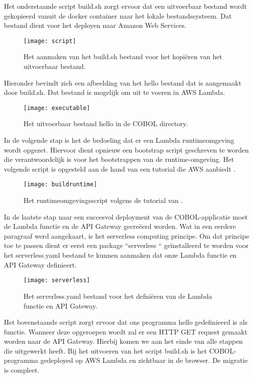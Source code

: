 \newpage
Het onderstaande script build.sh zorgt ervoor dat een uitvoerbaar bestand wordt gekopieerd vanuit de docker container naar het lokale bestandssysteem. Dat bestand dient voor het deployen naar Amazon Web Services. 

  \begin{figure}[h]
    \centering
    \texttt{[image: script]}
    \caption{Het aanmaken van het build.sh bestand voor het kopiëren van het uitvoerbaar bestand.}
\end{figure}

Hieronder bevindt zich een afbeelding van het hello bestand dat is aangemaakt door build.sh. Dat bestand is mogelijk om uit te voeren in AWS Lambda.

  \begin{figure}[h]
    \centering
    \texttt{[image: executable]}
    \caption{Het uitvoerbaar bestand hello in de COBOL directory.}
\end{figure}

\newpage
In de volgende stap is het de bedoeling dat er een Lambda runtimeomgeving wordt opgezet. Hiervoor dient opnieuw een bootstrap script geschreven te worden die verantwoordelijk is voor het bootstrappen van de runtime-omgeving. Het volgende script is opgesteld aan de hand van een tutorial die AWS aanbiedt \autocite{AWS2022}. 

 \begin{figure}[h]
    \centering
    \texttt{[image: buildruntime]}
    \caption{Het runtimeomgevingsscript volgens de tutorial van \autocite{AWS2022}.}
\end{figure}

In de laatste stap naar een succesvol deployment van de COBOL-applicatie moet de Lambda functie en de API Gateway gecreëerd worden. Wat in een eerdere paragraaf werd aangekaart, is het serverless computing principe. Om dat principe toe te passen dient er eerst een package ``serverless `` geïnstalleerd te worden voor het serverless.yaml bestand te kunnen aanmaken dat onze Lambda functie en API Gateway definieert. 

 \begin{figure}[h]
    \centering
    \texttt{[image: serverless]}
    \caption{Het serverless.yaml bestand voor het defniëren van de Lambda functie en API Gateway.}
\end{figure}

\newpage

Het bovenstaande script zorgt ervoor dat ons programma hello gedefinieerd is als functie. Wanneer deze opgeroepen wordt zal er een HTTP GET request gemaakt worden naar de API Gateway. Hierbij komen we aan het einde van alle stappen die \textcite{Paika2020} uitgewerkt heeft. Bij het uitvoeren van het script build.sh is het COBOL-programma gedeployed op AWS Lambda en zichtbaar in de browser. De migratie is compleet.


